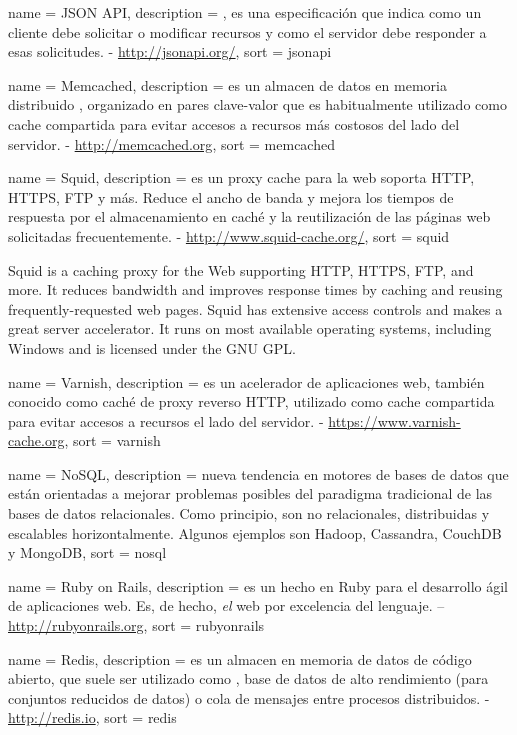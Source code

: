  {
  name = {JSON API},
  description = {, es una especificación que indica como un cliente debe solicitar o modificar recursos y como el servidor debe responder a esas solicitudes. - \url{http://jsonapi.org/}},
  sort = {jsonapi}
}

 {
  name = {Memcached},
  description = {es un almacen de datos en memoria distribuido , organizado en pares clave-valor que es habitualmente utilizado como cache compartida para evitar accesos a recursos más costosos del lado del servidor. - \url{http://memcached.org}},
  sort = {memcached}
}

 {
  name = {Squid},
  description = {es un proxy cache para la web soporta HTTP, HTTPS, FTP y más. Reduce el ancho de banda y mejora los tiempos de respuesta por el almacenamiento en caché y la reutilización de las páginas web solicitadas frecuentemente. - \url{http://www.squid-cache.org/}},
  sort = {squid}
}

Squid is a caching proxy for the Web supporting HTTP, HTTPS, FTP, and more. It reduces bandwidth and improves response times by caching and reusing frequently-requested web pages. Squid has extensive access controls and makes a great server accelerator. It runs on most available operating systems, including Windows and is licensed under the GNU GPL.

 {
  name = {Varnish},
  description = {es un acelerador de aplicaciones web, también conocido como caché de proxy reverso HTTP, utilizado como cache compartida para evitar accesos a recursos el lado del servidor. - \url{https://www.varnish-cache.org}},
  sort = {varnish}
}

 {
  name = {NoSQL},
  description = {nueva tendencia en motores de bases de datos que están orientadas a mejorar problemas posibles del paradigma tradicional de las bases de datos relacionales. Como principio, son no relacionales, distribuidas y escalables horizontalmente. Algunos ejemplos son Hadoop, Cassandra, CouchDB y MongoDB},
  sort = {nosql}
}

 {
  name = {Ruby on Rails},
  description = {es un  hecho en Ruby para el desarrollo ágil de aplicaciones web. Es, de hecho, \textit{el}  web por excelencia del lenguaje. – \url{http://rubyonrails.org}},
  sort = {rubyonrails}
}

 {
  name = {Redis},
  description = {es un almacen en memoria de datos de código abierto, que suele ser utilizado como , base de datos de alto rendimiento (para conjuntos reducidos de datos) o cola de mensajes entre procesos distribuidos. - \url{http://redis.io}},
  sort = {redis}
}

